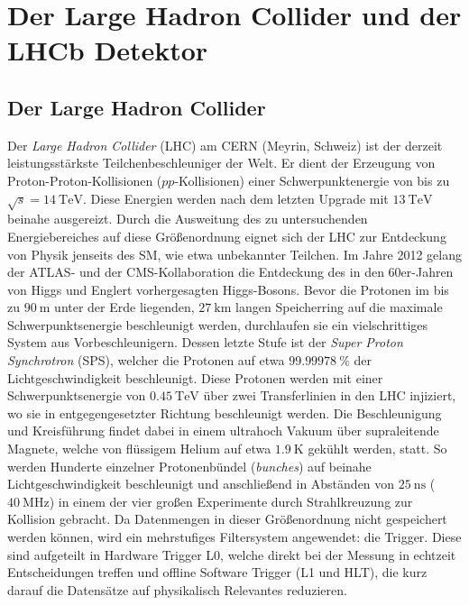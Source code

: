 \chapter{Der Large Hadron Collider und der LHCb Detektor}
\label{chap:3}
%
\section{Der Large Hadron Collider}
%
Der \textit{Large Hadron Collider} (LHC) am CERN (Meyrin, Schweiz) ist der derzeit leistungsstärkste Teilchenbeschleuniger der Welt. Er dient der Erzeugung von Proton-Proton-Kollisionen ($pp$-Kollisionen) einer Schwerpunktenergie von bis zu $\sqrt{s}=\SI{14}{\tera\electronvolt}$\cite{lhc}. Diese Energien werden nach dem letzten Upgrade mit $\SI{13}{\tera\electronvolt}$ beinahe ausgereizt\cite{lhc}. Durch die Ausweitung des zu untersuchenden Energiebereiches auf diese Größenordnung eignet sich der LHC zur Entdeckung von Physik jenseits des SM, wie etwa unbekannter Teilchen. Im Jahre 2012 gelang der ATLAS- und der CMS-Kollaboration die Entdeckung des in den 60er-Jahren von Higgs und Englert vorhergesagten Higgs-Bosons\cite{higgs}.
Bevor die Protonen im bis zu $\SI{90}{\meter}$ unter der Erde liegenden, $\SI{27}{\kilo\meter}$ langen Speicherring auf die maximale Schwerpunktsenergie beschleunigt werden, durchlaufen sie ein vielschrittiges System aus Vorbeschleunigern. Dessen letzte Stufe ist der \textit{Super Proton Synchrotron} (SPS), welcher die Protonen auf etwa $\SI{99,99978}{\percent}$ der Lichtgeschwindigkeit beschleunigt\cite{lhc}. Diese Protonen werden mit einer Schwerpunktsenergie von $\SI{0,45}{\tera\electronvolt}$ über zwei Transferlinien in den LHC injiziert, wo sie in entgegengesetzter Richtung beschleunigt werden. Die Beschleunigung und Kreisführung findet dabei in einem ultrahoch Vakuum über supraleitende Magnete, welche von flüssigem Helium auf etwa $\SI{1,9}{\kelvin}$ gekühlt werden, statt. So werden Hunderte einzelner Protonenbündel (\textit{bunches}) auf beinahe Lichtgeschwindigkeit beschleunigt und anschließend in Abständen von $\SI{25}{\nano\second}$
($\SI{40}{\mega\hertz}$) in einem der vier großen Experimente durch Strahlkreuzung zur Kollision gebracht. Da Datenmengen in dieser Größenordnung nicht gespeichert werden können, wird ein mehrstufiges Filtersystem angewendet: die Trigger. Diese sind aufgeteilt in Hardware Trigger \textsc{L0}, welche direkt bei der Messung in echtzeit Entscheidungen treffen und offline Software Trigger (\textsc{L1} und \textsc{HLT}), die kurz darauf die Datensätze auf physikalisch Relevantes reduzieren.
%
